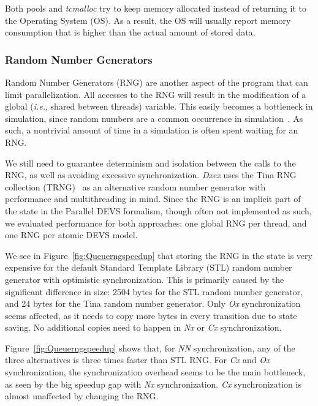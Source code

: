 Both pools and \textit{tcmalloc} try to keep memory allocated instead of returning it to the Operating System (OS).
As a result, the OS will usually report memory consumption that is higher than the actual amount of stored data.

\subsubsection{Random Number Generators}
Random Number Generators (RNG) are another aspect of the program that can limit parallelization.
All accesses to the RNG will result in the modification of a global (\textit{i.e.}, shared between threads) variable.
This easily becomes a bottleneck in simulation, since random numbers are a common occurrence in simulation~\cite{Random}.
As such, a nontrivial amount of time in a simulation is often spent waiting for an RNG.

We still need to guarantee determinism and isolation between the calls to the RNG, as well as avoiding excessive synchronization.
\textit{Dxex} uses the Tina RNG collection (TRNG)~\cite{PhysRevE.75.066701} as an alternative random number generator with performance and multithreading in mind.
Since the RNG is an implicit part of the state in the \textsf{Parallel DEVS} formalism, though often not implemented as such, we evaluated performance for both approaches: one global RNG per thread, and one RNG per atomic \textsf{DEVS} model.

We see in Figure~\ref{fig:Queuerngspeedup} that storing the RNG in the state is very expensive for the default Standard Template Library (STL) random number generator with optimistic synchronization.
This is primarily caused by the significant difference in size: 2504 bytes for the STL random number generator, and 24 bytes for the Tina random number generator.
Only \textit{Ox} synchronization seems affected, as it needs to copy more bytes in every transition due to state saving.
No additional copies need to happen in \textit{Nx} or \textit{Cx} synchronization.

Figure~\ref{fig:Queuerngspeedup} shows that, for \textit{NN} synchronization, any of the three alternatives is three times faster than STL RNG.
For \textit{Cx} and \textit{Ox} synchronization, the synchronization overhead seems to be the main bottleneck, as seen by the big speedup gap with \textit{Nx} synchronization.
\textit{Cx} synchronization is almost unaffected by changing the RNG.

